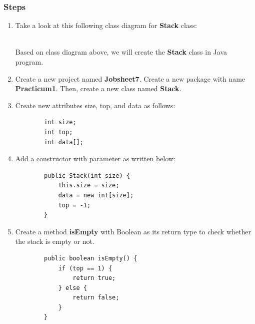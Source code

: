 \documentclass[12pt,titlepage]{article}
\begin{document}
\subsubsection{Steps}

\begin{enumerate}
    \item Take a look at this following class diagram for \textbf{Stack} class:
    \mbox{}\\
    \mbox{}\\
    Based on class diagram above, we will create the \textbf{Stack} class in Java program.
    \item Create a new project named \textbf{Jobsheet7}. Create a new package with name \textbf{Practicum1}. Then, create a new class named \textbf{Stack}.
    \item Create new attributes size, top, and data as follows:
    \begin{verbatim}
        int size;
        int top;
        int data[];
    \end{verbatim}
    \item Add a constructor with parameter as written below:
    \begin{verbatim}
        public Stack(int size) {
            this.size = size;
            data = new int[size];
            top = -1;
        }
    \end{verbatim}
    \item Create a method \textbf{isEmpty} with Boolean as its return type to check whether the stack is empty or not.
    \begin{verbatim}
        public boolean isEmpty() {
            if (top == 1) {
                return true;
            } else {
                return false;
            }
        }
    \end{verbatim}

\end{enumerate}
\end{document}
